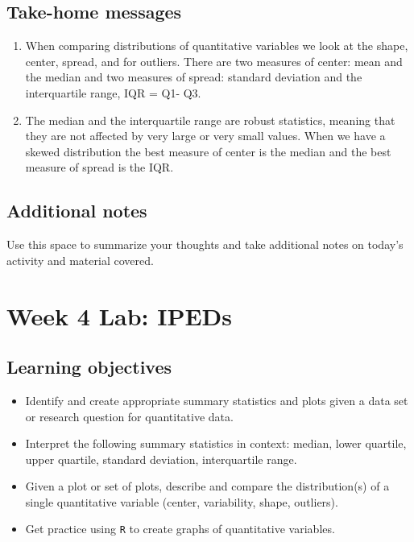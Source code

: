 \documentclass[
]{report}
\begin{document}
\vspace{0.5in}

\hypertarget{take-home-messages-6}{%
\subsection{Take-home messages}\label{take-home-messages-6}}

\begin{enumerate}
\def\labelenumi{\arabic{enumi}.}
\item
  When comparing distributions of quantitative variables we look at the shape, center, spread, and for outliers. There are two measures of center: mean and the median and two measures of spread: standard deviation and the interquartile range, IQR = Q1- Q3.
\item
  The median and the interquartile range are robust statistics, meaning that they are not affected by very large or very small values. When we have a skewed distribution the best measure of center is the median and the best measure of spread is the IQR.
\end{enumerate}

\hypertarget{additional-notes-4}{%
\subsection{Additional notes}\label{additional-notes-4}}

Use this space to summarize your thoughts and take additional notes on today's activity and material covered.

\newpage

\hypertarget{week-4-lab-ipeds}{%
\section{Week 4 Lab: IPEDs}\label{week-4-lab-ipeds}}


\hypertarget{learning-objectives-2}{%
\subsection{Learning objectives}\label{learning-objectives-2}}

\begin{itemize}
\item
  Identify and create appropriate summary statistics and plots
  given a data set or research question for quantitative data.
\item
  Interpret the following summary statistics in context:
  median, lower quartile, upper quartile,
  standard deviation, interquartile range.
\item
  Given a plot or set of plots, describe and compare the distribution(s)
  of a single quantitative variable
  (center, variability, shape, outliers).
\item
  Get practice using \texttt{R} to create graphs of quantitative variables.
\end{itemize}
\end{document}
